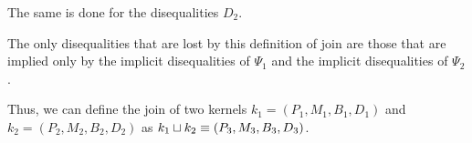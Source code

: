 The same is done for the disequalities $D_2$.

The only disequalities that are lost by this definition of join are those that are implied only by the implicit disequalities of $\Psi_1$ and the implicit disequalities of $\Psi_2$.

Thus, we can define the join of two kernels $k_1 = (P_1, M_1,B_1, D_1)$ and $k_2 = (P_2, M_2,B_2, D_2)$ as $k_1 \sqcup k_2 \equiv (P_3, M_3,B_3, D_3)$.
